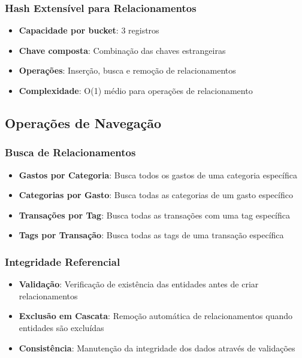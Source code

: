\documentclass[12pt,a4paper]{article}
\begin{document}
\subsubsection*{Hash Extensível para Relacionamentos}
\begin{itemize}
  \item \textbf{Capacidade por bucket}: 3 registros
  \item \textbf{Chave composta}: Combinação das chaves estrangeiras
  \item \textbf{Operações}: Inserção, busca e remoção de relacionamentos
  \item \textbf{Complexidade}: O(1) médio para operações de relacionamento
\end{itemize}

\subsection{Operações de Navegação}

\subsubsection*{Busca de Relacionamentos}
\begin{itemize}
  \item \textbf{Gastos por Categoria}: Busca todos os gastos de uma categoria específica
  \item \textbf{Categorias por Gasto}: Busca todas as categorias de um gasto específico
  \item \textbf{Transações por Tag}: Busca todas as transações com uma tag específica
  \item \textbf{Tags por Transação}: Busca todas as tags de uma transação específica
\end{itemize}

\subsubsection*{Integridade Referencial}
\begin{itemize}
  \item \textbf{Validação}: Verificação de existência das entidades antes de criar relacionamentos
  \item \textbf{Exclusão em Cascata}: Remoção automática de relacionamentos quando entidades são excluídas
  \item \textbf{Consistência}: Manutenção da integridade dos dados através de validações
\end{itemize}
\end{document}
